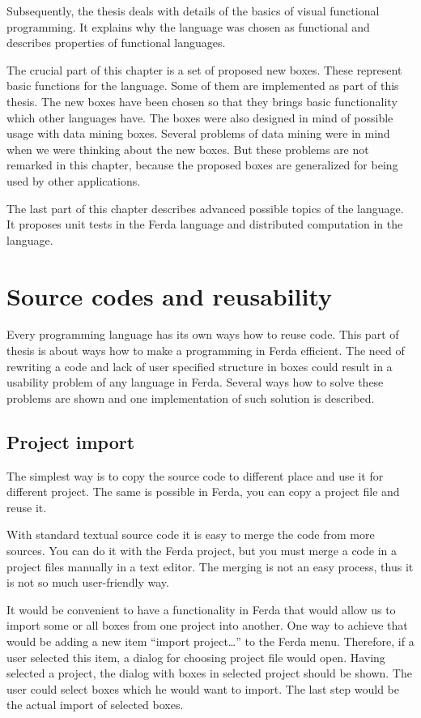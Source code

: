\documentclass[a4paper,12pt]{book}
\begin{document}
Subsequently, the thesis deals with details of the basics of visual functional programming. It explains why the language was chosen as functional and describes properties of functional languages.

The crucial part of this chapter is a set of proposed new boxes. These represent basic functions for the language. Some of them are implemented as part of this thesis. The new boxes have been chosen so that they brings basic functionality which other languages have. The boxes were also designed in mind of possible usage with data mining boxes. Several problems of data mining were in mind when we were thinking about the new boxes. But these problems are not remarked in this chapter, because the proposed boxes are generalized for being used by other applications.

The last part of this chapter describes advanced possible topics of the language. It proposes unit tests in the Ferda language and distributed computation in the language.

\section{Source codes and reusability}
\label{sec:reusability}
Every programming language has its own ways how to reuse code. This part of thesis is about ways how to make a programming in Ferda efficient. The need of rewriting a code and lack of user specified structure in boxes could result in a usability problem of any language in Ferda. Several ways how to solve these problems are shown and one implementation of such solution is described.

\subsection{Project import}
The simplest way is to copy the source code to different place and use it for different project. The same is possible in Ferda, you can copy a project file and reuse it.

With standard textual source code it is easy to merge the code from more sources. You can do it with the Ferda project, but you must merge a code in a project files manually in a text editor. The merging is not an easy process, thus it is not so much user-friendly way.

It would be convenient to have a functionality in Ferda that would allow us to import some or all boxes from one project into another. One way to achieve that would be adding a new item ``import project…'' to the Ferda menu. Therefore, if a user selected this item, a dialog for choosing project file would open. Having selected a project, the dialog with boxes in selected project should be shown. The user could select boxes which he would want to import. The last step would be the actual import of selected boxes.
\end{document}
